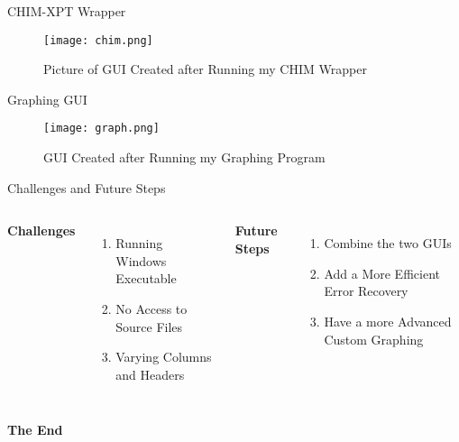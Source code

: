 \documentclass[aspectratio=169,xcolor=dvipsnames]{beamer}
\begin{document}

\begin{frame}{CHIM-XPT Wrapper}
    \begin{figure}
        \centering
        \texttt{[image: chim.png]}
        \caption{Picture of GUI Created after Running my CHIM Wrapper}
        \label{fig:enter-label}
    \end{figure}
\end{frame}


\begin{frame}{Graphing GUI}
    \begin{figure}
        \centering
        \texttt{[image: graph.png]}
        \caption{GUI Created after Running my Graphing Program}
        \label{fig:enter-label}
    \end{figure}
\end{frame}

\begin{frame}{Challenges and Future Steps}
    \begin{columns}[c] %

        \textbf{Challenges}
        \begin{enumerate}
            \item Running Windows Executable
            \item No Access to Source Files
            \item Varying Columns and Headers
    \end{enumerate}

        \textbf{Future Steps}
        \begin{enumerate}
            \item Combine the two GUIs
            \item Add a More Efficient Error Recovery
            \item Have a more Advanced Custom Graphing
        \end{enumerate}
        
    \end{columns}
\end{frame}


\begin{frame}
    \Huge{\centerline{\textbf{The End}}}
\end{frame}

\end{document}
